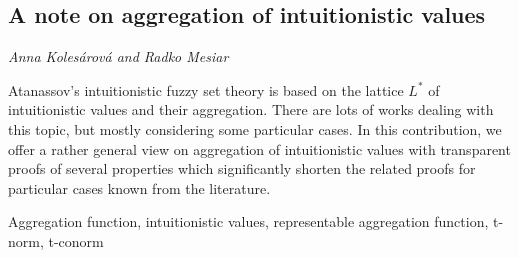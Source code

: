 \documentclass[../booklet.tex]{subfiles}
\begin{document}
\subsection[A note on aggregation of intuitionistic values. {\it Anna Kolesárová and Radko Mesiar}]{A note on aggregation of intuitionistic values}
 

\begin{center}
  {\it Anna Kolesárová and Radko Mesiar}
\end{center}

\vskip 0.8cm

 Atanassov's intuitionistic fuzzy set theory is based on the lattice $L^*$ of intuitionistic values and their aggregation. There are lots of
works dealing with this topic, but mostly considering some particular cases. In this contribution, we offer  a rather general view on aggregation of intuitionistic values with transparent proofs of several properties which significantly shorten the related proofs for particular cases known from the literature.


\noindent
\smallskip
{} Aggregation function, intuitionistic values, representable aggregation function, t-norm, t-conorm
\end{document}
